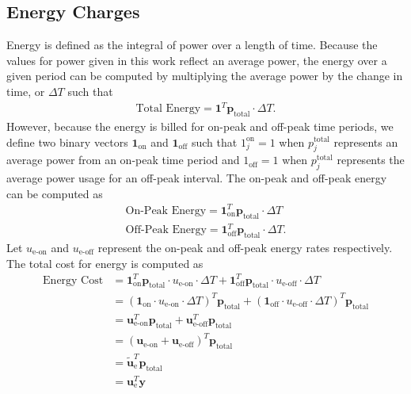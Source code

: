 \subsection{Energy Charges}
Energy is defined as the integral of power over a length of time.  Because the values for power given in this work reflect an average power, the energy over a given period can be computed by multiplying the average power by the change in time, or $\Delta T$ such that
\begin{equation}\begin{aligned}
	\text{Total Energy} = \mathbf{1}^T\mathbf{p}_{\text{total}}\cdot \Delta T.
\end{aligned}\end{equation}
However, because the energy is billed for on-peak and off-peak time periods, we define two binary vectors $\mathbf{1}_{\text{on}}$ and $\mathbf{1}_{\text{off}}$ such that $1^{\text{on}}_j = 1$ when $p_j^{\text{total}}$ represents an average power from an on-peak time period and $1_{\text{off}} = 1$ when $p_j^{\text{total}}$ represents the average power usage for an off-peak interval. The on-peak and off-peak energy can be computed as
\begin{equation}\begin{aligned}
	\text{On-Peak Energy} = \mathbf{1}_{\text{on}}^T\mathbf{p}_{\text{total}}\cdot\Delta T\\
	\text{Off-Peak Energy} = \mathbf{1}_{\text{off}}^T\mathbf{p}_{\text{total}}\cdot\Delta T.
\end{aligned}\end{equation}
Let $u_{\text{e-on}}$ and $u_{\text{e-off}}$ represent the on-peak and off-peak energy rates respectively. The total cost for energy is computed as
\begin{equation} \begin{aligned}
	\text{Energy Cost} &= \mathbf{1}_{\text{on}}^T\mathbf{p}_{\text{total}}\cdot u_{\text{e-on}}\cdot\Delta T + \mathbf{1}_{\text{off}}^T\mathbf{p}_{\text{total}}\cdot u_{\text{e-off}}\cdot\Delta T \\
			   &= \left(\mathbf{1}_{\text{on}}\cdot u_{\text{e-on}}\cdot\Delta T \right )^T\mathbf{p}_{\text{total}} + \left(\mathbf{1}_{\text{off}}\cdot u_{\text{e-off}}\cdot\Delta T \right )^T\mathbf{p}_{\text{total}} \\
			   &= \mathbf{u}_{\text{e-on}}^T\mathbf{p}_{\text{total}} + \mathbf{u}_{\text{e-off}}^T\mathbf{p}_{\text{total}} \\
			   &= \left(\mathbf{u}_{\text{e-on}} + \mathbf{u}_{\text{e-off}}\right )^T\mathbf{p}_{\text{total}}\\
			   &= \mathbf{\tilde{u}}_{\text{e}}^T\mathbf{p}_{\text{total}} \\
			   &= \mathbf{u}_{\text{e}}^T\mathbf{y}
\end{aligned} \end{equation}
